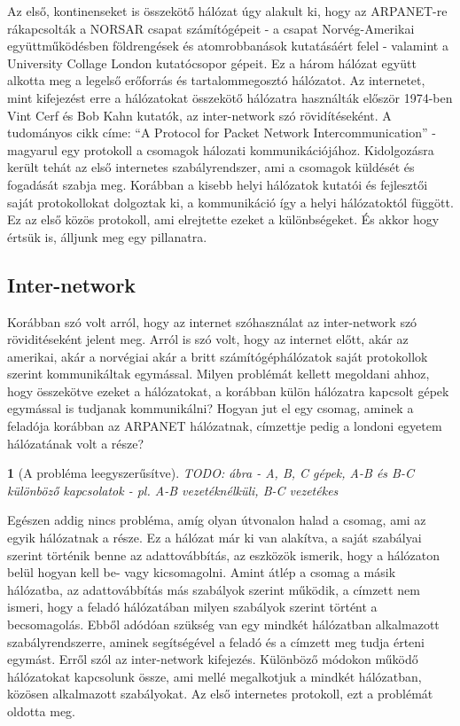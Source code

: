\documentclass[a4paper, 12pt, oneside]{article}
\newtheorem*{defin}{}
\begin{document}
Az első, kontinenseket is összekötő hálózat úgy alakult ki, hogy az ARPANET-re rákapcsolták a NORSAR csapat számítógépeit - a csapat Norvég-Amerikai együttműködésben földrengések és atomrobbanások kutatásáért felel - valamint a University Collage London kutatócsopor gépeit. Ez a három hálózat együtt alkotta meg a legelső erőforrás és tartalommegosztó hálózatot. Az internetet, mint kifejezést erre a hálózatokat összekötő hálózatra használták először 1974-ben Vint Cerf és Bob Kahn kutatók, az inter-network szó rövidítéseként. A tudományos cikk címe: ``A Protocol for Packet Network Intercommunication'' - magyarul egy protokoll a csomagok hálozati kommunikációjához. Kidolgozásra került tehát az első internetes szabályrendszer, ami a csomagok küldését és fogadását szabja meg. Korábban a kisebb helyi hálózatok kutatói és fejlesztői saját protokollokat dolgoztak ki, a kommunikáció így a helyi hálózatoktól függött. Ez az első közös protokoll, ami elrejtette ezeket a különbségeket. És akkor hogy értsük is, álljunk meg egy pillanatra.

\subsection*{Inter-network}

Korábban szó volt arról, hogy az internet szóhasználat az inter-network szó röviditéseként jelent meg. Arról is szó volt, hogy az internet előtt, akár az amerikai, akár a norvégiai akár a britt számítógéphálózatok saját protokollok szerint kommunikáltak egymással. Milyen problémát kellett megoldani ahhoz, hogy összekötve ezeket a hálózatokat, a korábban külön hálózatra kapcsolt gépek egymással is tudjanak kommunikálni? Hogyan jut el egy csomag, aminek a feladója korábban az ARPANET hálózatnak, címzettje pedig a londoni egyetem hálózatának volt a része? 

\begin{center}
\begin{defin}[A probléma leegyszerűsítve]
TODO: ábra - A, B, C gépek, A-B és B-C különböző kapcsolatok - pl. A-B vezetéknélküli, B-C vezetékes
\end{defin}
\end{center}

Egészen addig nincs probléma, amíg olyan útvonalon halad a csomag, ami az egyik hálózatnak a része. Ez a hálózat már ki van alakítva, a saját szabályai szerint történik benne az adattovábbítás, az eszközök ismerik, hogy a hálózaton belül hogyan kell be- vagy kicsomagolni. Amint átlép a csomag a másik hálózatba, az adattovábbítás más szabályok szerint működik, a címzett nem ismeri, hogy a feladó hálózatában milyen szabályok szerint történt a becsomagolás. Ebből adódóan szükség van egy mindkét hálózatban alkalmazott szabályrendszerre, aminek segítségével a feladó és a címzett meg tudja érteni egymást. Erről szól az inter-network kifejezés. Különböző módokon működő hálózatokat kapcsolunk össze, ami mellé megalkotjuk a mindkét hálózatban, közösen alkalmazott szabályokat. Az első internetes protokoll, ezt a problémát oldotta meg.
\end{document}
